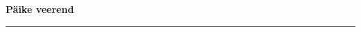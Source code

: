 \documentclass[10pt]{book}
\begin{document}
{
  \samepage
  \raggedbottom
  \raggedright
  \sloppy


  \vspace{0.2in}

  \noindent\begin{minipage}{.1\textwidth}
    \hfill\vspace{0.1in}
  \end{minipage}%
  \noindent\begin{minipage}{.8\textwidth}
    \centering
    \bfseries
    \large P\"aike veerend
  \end{minipage}%
  \noindent\begin{minipage}{.1\textwidth}
      \hfill\vspace{0.1in}
  \end{minipage}

  \nopagebreak[4]
  \vspace{0.1in}
  \nopagebreak[4]
  \hrule height 0.05ex
  \nopagebreak[4]
  \vspace{-0.05in}




}
\end{document}
